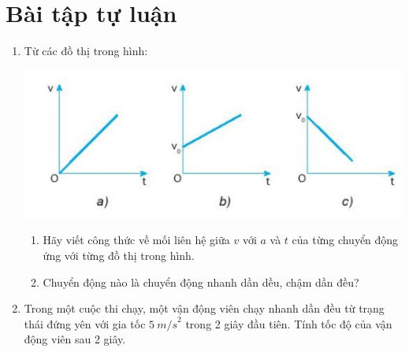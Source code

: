 \section{Bài tập tự luận}
\begin{enumerate}[label=\bfseries Bài \arabic*:,leftmargin=1.5cm]
	\item {}
	
	{ Từ các đồ thị trong hình:
		\begin{center}
			\includegraphics[scale=1]{../figs/VN10-2022-PH-TP012-1.jpg}
		\end{center}
		
		\begin{enumerate}[label=\alph*)]
			\item Hãy viết công thức về mối liên hệ giữa $v$ với $a$ và $t$ của từng chuyển động ứng với từng đồ thị trong hình.
			\item Chuyển động nào là chuyển động nhanh dần dều, chậm dần đều?
		\end{enumerate}
		
	}
	

	
	\item {}
	
	{
		Trong một cuộc thi chạy, một vận động viên chạy nhanh dần đều từ trạng thái đứng yên với gia tốc $\SI{5}{m/s}^2$ trong 2 giây đầu tiên. Tính tốc độ của vận động viên sau 2 giây.
	}
	\hideall{
		
}
\end{enumerate}
